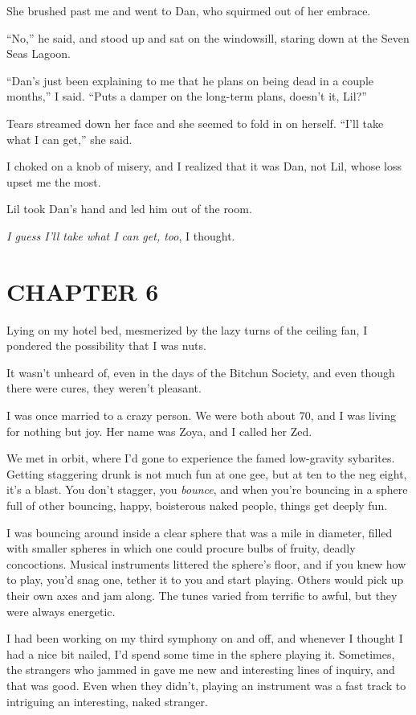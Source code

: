 She brushed past me and went to Dan, who squirmed out of her
embrace.

“No,” he said, and stood up and sat on the windowsill, staring down
at the Seven Seas Lagoon.

“Dan's just been explaining to me that he plans on being dead in a
couple months,” I said. “Puts a damper on the long-term plans,
doesn't it, Lil?”

Tears streamed down her face and she seemed to fold in on herself.
“I'll take what I can get,” she said.

I choked on a knob of misery, and I realized that it was Dan, not
Lil, whose loss upset me the most.

Lil took Dan's hand and led him out of the room.

\emph{I guess I'll take what I can get, too}, I thought.

\section{CHAPTER 6}

Lying on my hotel bed, mesmerized by the lazy turns of the ceiling
fan, I pondered the possibility that I was nuts.

It wasn't unheard of, even in the days of the Bitchun Society, and
even though there were cures, they weren't pleasant.

I was once married to a crazy person. We were both about 70, and I
was living for nothing but joy. Her name was Zoya, and I called her
Zed.

We met in orbit, where I'd gone to experience the famed low-gravity
sybarites. Getting staggering drunk is not much fun at one gee, but
at ten to the neg eight, it's a blast. You don't stagger, you
\emph{bounce}, and when you're bouncing in a sphere full of other
bouncing, happy, boisterous naked people, things get deeply fun.

I was bouncing around inside a clear sphere that was a mile in
diameter, filled with smaller spheres in which one could procure
bulbs of fruity, deadly concoctions. Musical instruments littered
the sphere's floor, and if you knew how to play, you'd snag one,
tether it to you and start playing. Others would pick up their own
axes and jam along. The tunes varied from terrific to awful, but
they were always energetic.

I had been working on my third symphony on and off, and whenever I
thought I had a nice bit nailed, I'd spend some time in the sphere
playing it. Sometimes, the strangers who jammed in gave me new and
interesting lines of inquiry, and that was good. Even when they
didn't, playing an instrument was a fast track to intriguing an
interesting, naked stranger.

